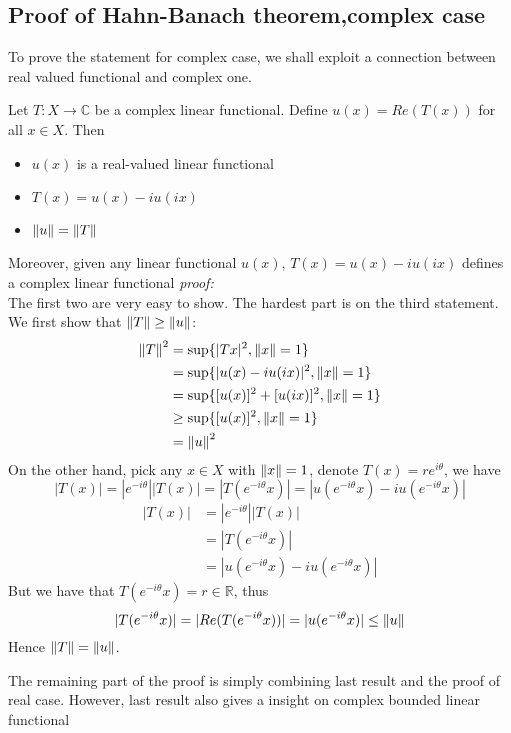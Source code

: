 \subsection{Proof of Hahn-Banach theorem,complex case}
To prove the statement for complex case, we shall exploit a connection between real valued functional and complex one.\\
\begin{proposition}\rm\nextline
	Let $T:X\xrightarrow{}\mathbb{C}$ be a complex linear functional. Define $u(x)=Re(T(x))$ for all $x\in X$. Then
	\begin{itemize}
		\item $u(x)$ is a real-valued linear functional
		\item $T(x)=u(x)-iu(ix)$
		\item $\left\|{u}\right\|=\left\|{T}\right\|$
	\end{itemize}
	Moreover, given any linear functional $u(x)$, $T(x)=u(x)-iu(ix)$ defines a complex linear functional
	\textit{proof:}\\
	The first two are very easy to show. The hardest part is on the third statement. We first show that $\left\|{T}\right\|\geq\left\|{u}\right\|$:
	\begin{equation}
		\begin{split}
			\left\|{T}\right\|^2&=\sup\{|T x|^2,\left\|{x}\right\|=1\}\\
			&=\sup\{|u(x)-iu(ix)|^2,\left\|{x}\right\|=1\}\\
			&=\sup \{[u(x)]^2+[u(ix)]^2,\left\|{x}\right\|=1\}\\
			&\geq \sup \{[u(x)]^2,\left\|{x}\right\|=1\}\\
			&=\left\|{u}\right\|^2
		\end{split}
	\end{equation}
	On the other hand, pick any $x\in X$ with $\left\|{x}\right\|=1$, denote $T(x)=re^{i\theta}$, we have
	$$|T(x)|=|e^{-i\theta}||T(x)|=|T(e^{-i\theta}x)|=|u(e^{-i\theta}x)-iu(e^{-i\theta}x)|$$
	\begin{equation}
		\begin{split}
			|T(x)|&=|e^{-i\theta}||T(x)|\\
			&=|T(e^{-i\theta}x)|\\
			&=|u(e^{-i\theta}x)-iu(e^{-i\theta}x)|
		\end{split}
	\end{equation}
	But we have that $T(e^{-i\theta}x)=r\in\mathbb{R}$, thus
	$$
		|T(e^{-i\theta}x)|=|Re(T(e^{-i\theta}x))|=|u(e^{-i\theta}x)|\leq\left\|{u}\right\|
	$$
	Hence $\left\|{T}\right\|=\left\|{u}\right\|$.
\end{proposition}
The remaining part of the proof is simply combining last result and the proof of real case. However, last result also gives a insight on complex bounded linear functional

